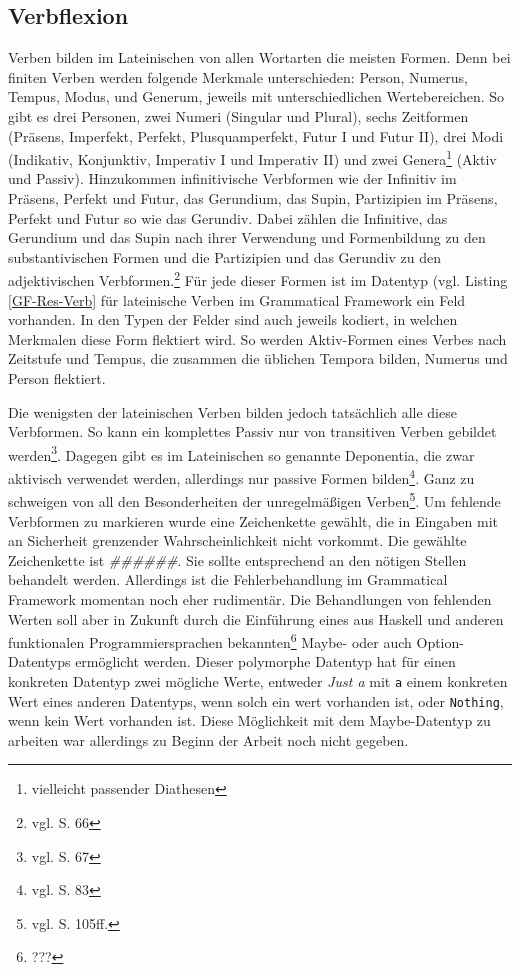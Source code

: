 \documentclass[fontsize=12pt,abstract=on,titlepage,bibliography=totoc,ngerman,listof=totoc]{scrreprt}
\begin{document}
\subsection{Verbflexion}
\label{subsec:verb}
Verben bilden im Lateinischen von allen Wortarten die meisten Formen. Denn bei finiten Verben werden folgende Merkmale unterschieden: Person, Numerus, Tempus, Modus, und Generum, jeweils mit unterschiedlichen Wertebereichen. So gibt es drei Personen, zwei Numeri (Singular und Plural), sechs Zeitformen (Präsens, Imperfekt, Perfekt, Plusquamperfekt, Futur I und Futur II), drei Modi (Indikativ, Konjunktiv, Imperativ I und Imperativ II) und zwei Genera\footnote{vielleicht passender Diathesen} (Aktiv und Passiv). Hinzukommen infinitivische Verbformen wie der Infinitiv im Präsens, Perfekt und Futur, das Gerundium, das Supin, Partizipien im Präsens, Perfekt und Futur so wie das Gerundiv. Dabei zählen die Infinitive, das Gerundium und das Supin nach ihrer Verwendung und Formenbildung zu den substantivischen Formen und die Partizipien und das Gerundiv zu den adjektivischen Verbformen.\footnote{vgl. \cite{BAYER-LINDAUER1994} S. 66} Für jede dieser Formen ist im Datentyp (vgl. Listing \ref{GF-Res-Verb} für lateinische Verben im Grammatical Framework ein Feld vorhanden. In den Typen der Felder sind auch jeweils kodiert, in welchen Merkmalen diese Form flektiert wird. So werden Aktiv-Formen eines Verbes nach Zeitstufe und Tempus, die zusammen die üblichen Tempora bilden, Numerus und Person flektiert.  \par
Die wenigsten der lateinischen Verben bilden jedoch tatsächlich alle diese Verbformen. So kann ein komplettes Passiv nur von transitiven Verben gebildet werden\footnote{vgl. \cite{BAYER-LINDAUER1994} S. 67}. Dagegen gibt es im Lateinischen so genannte Deponentia, die zwar aktivisch verwendet werden, allerdings nur passive Formen bilden\footnote{vgl. \cite{BAYER-LINDAUER1994} S. 83}. Ganz zu schweigen von all den Besonderheiten der unregelmäßigen Verben\footnote{vgl. \cite{BAYER-LINDAUER1994} S. 105ff.}. Um fehlende Verbformen zu markieren wurde eine Zeichenkette gewählt, die in Eingaben mit an Sicherheit grenzender Wahrscheinlichkeit nicht vorkommt. Die gewählte Zeichenkette ist \textit{\#\#\#\#\#\#}. Sie sollte entsprechend an den nötigen Stellen behandelt werden. Allerdings ist die Fehlerbehandlung im Grammatical Framework momentan noch eher rudimentär. Die Behandlungen von fehlenden Werten soll aber in Zukunft durch die Einführung eines aus Haskell und anderen funktionalen Programmiersprachen bekannten\footnote{???} Maybe- oder auch Option-Datentyps ermöglicht werden. Dieser polymorphe Datentyp hat für einen konkreten Datentyp zwei mögliche Werte, entweder \textit{Just a} mit \texttt{a} einem konkreten Wert eines anderen Datentyps, wenn solch ein wert vorhanden ist, oder \texttt{Nothing}, wenn kein Wert vorhanden ist. Diese Möglichkeit mit dem Maybe-Datentyp zu arbeiten war allerdings zu Beginn der Arbeit noch nicht gegeben.\par
\end{document}
